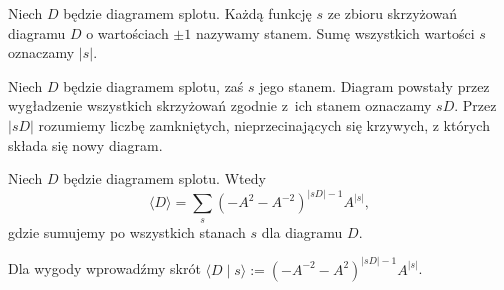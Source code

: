 \begin{definition}[stan]
    \label{stan diagramu}
    Niech $D$ będzie diagramem splotu.
    Każdą funkcję $s$ ze zbioru skrzyżowań diagramu $D$ o wartościach $\pm 1$ nazywamy stanem.
    Sumę wszystkich wartości $s$ oznaczamy $|s|$.
\end{definition}

\begin{definition}
    Niech $D$ będzie diagramem splotu, zaś $s$ jego stanem.
    Diagram powstały przez wygładzenie wszystkich skrzyżowań zgodnie z~ich stanem oznaczamy $sD$.
    Przez $|sD|$ rozumiemy liczbę zamkniętych, nieprzecinających się krzywych, z których składa się nowy diagram.
\end{definition}

\begin{proposition}
    Niech $D$ będzie diagramem splotu.
    Wtedy
    \begin{equation}
        \langle D\rangle = \sum_s (-A^2-A^{-2})^{|sD|-1} A^{|s|},
    \end{equation}
    gdzie sumujemy po wszystkich stanach $s$ dla diagramu $D$.
\end{proposition}

Dla wygody wprowadźmy skrót $\langle D \mid s \rangle := (-A^{-2}-A^2)^{|sD|-1}A^{|s|}$.

